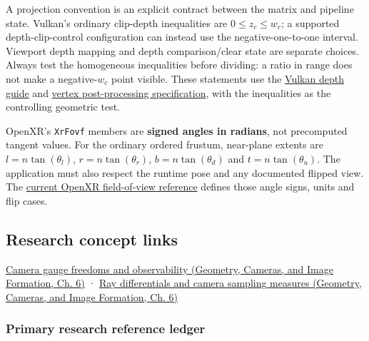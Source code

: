 A projection convention is an explicit contract between the matrix and pipeline state. Vulkan's ordinary clip-depth inequalities are \(0\le z_c\le w_c\); a supported depth-clip-control configuration can instead use the negative-one-to-one interval. Viewport depth mapping and depth comparison/clear state are separate choices. Always test the homogeneous inequalities before dividing: a ratio in range does not make a negative-\(w_c\) point visible. These statements use the \href{https://docs.vulkan.org/guide/latest/depth.html}{Vulkan depth guide} and \href{https://docs.vulkan.org/spec/latest/chapters/vertexpostproc.html}{vertex post-processing specification}, with the inequalities as the controlling geometric test.

OpenXR's \texttt{XrFovf} members are \textbf{signed angles in radians}, not precomputed tangent values. For the ordinary ordered frustum, near-plane extents are \(l=n\tan(\theta_l)\), \(r=n\tan(\theta_r)\), \(b=n\tan(\theta_d)\) and \(t=n\tan(\theta_u)\). The application must also respect the runtime pose and any documented flipped view. The \href{https://registry.khronos.org/OpenXR/specs/1.1/man/html/XrFovf.html}{current OpenXR field-of-view reference} defines those angle signs, units and flip cases.

\subsection{Research concept links}\label{02-foundations-ii-ch039-research-concept-links}

\href{../03-Geometry-Cameras-and-Image-Formation/main.pdf\#nameddest=02-foundations-ii-ch037-a-camera-model-must-close-the-loop}{Camera gauge freedoms and observability (Geometry, Cameras, and Image Formation, Ch. 6)} · \href{../03-Geometry-Cameras-and-Image-Formation/main.pdf\#nameddest=02-foundations-ii-ch037-a-camera-model-must-close-the-loop}{Ray differentials and camera sampling measures (Geometry, Cameras, and Image Formation, Ch. 6)}

\subsubsection{Primary research reference ledger}\label{02-foundations-ii-ch039-primary-research-reference-ledger}

